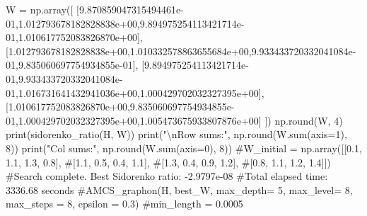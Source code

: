 \documentclass[
  letterpaper,
  DIV=11,
  numbers=noendperiod]{scrartcl}
\newenvironment{Shaded}{\begin{snugshade}}{\end{snugshade}}
\newcommand{\BuiltInTok}[1]{\textcolor[rgb]{0.00,0.23,0.31}{#1}}
\newcommand{\CharTok}[1]{\textcolor[rgb]{0.13,0.47,0.30}{#1}}
\newcommand{\CommentTok}[1]{\textcolor[rgb]{0.37,0.37,0.37}{#1}}
\newcommand{\DecValTok}[1]{\textcolor[rgb]{0.68,0.00,0.00}{#1}}
\newcommand{\FloatTok}[1]{\textcolor[rgb]{0.68,0.00,0.00}{#1}}
\newcommand{\NormalTok}[1]{\textcolor[rgb]{0.00,0.23,0.31}{#1}}
\newcommand{\OperatorTok}[1]{\textcolor[rgb]{0.37,0.37,0.37}{#1}}
\newcommand{\StringTok}[1]{\textcolor[rgb]{0.13,0.47,0.30}{#1}}
\begin{document}
\begin{Shaded}
\begin{Highlighting}[]
\NormalTok{W }\OperatorTok{=}\NormalTok{ np.array([}
\NormalTok{  [}\FloatTok{9.870859047315494461e{-}01}\NormalTok{,}\FloatTok{1.012793678182828838e+00}\NormalTok{,}\FloatTok{9.894975254113421714e{-}01}\NormalTok{,}\FloatTok{1.010617752083826870e+00}\NormalTok{],}
\NormalTok{[}\FloatTok{1.012793678182828838e+00}\NormalTok{,}\FloatTok{1.010332578863655684e+00}\NormalTok{,}\FloatTok{9.933433720332041084e{-}01}\NormalTok{,}\FloatTok{9.835060697754934855e{-}01}\NormalTok{],}
\NormalTok{[}\FloatTok{9.894975254113421714e{-}01}\NormalTok{,}\FloatTok{9.933433720332041084e{-}01}\NormalTok{,}\FloatTok{1.016731641432941036e+00}\NormalTok{,}\FloatTok{1.000429702032327395e+00}\NormalTok{],}
\NormalTok{[}\FloatTok{1.010617752083826870e+00}\NormalTok{,}\FloatTok{9.835060697754934855e{-}01}\NormalTok{,}\FloatTok{1.000429702032327395e+00}\NormalTok{,}\FloatTok{1.005473675933807876e+00}\NormalTok{]}
\NormalTok{])}
\NormalTok{np.}\BuiltInTok{round}\NormalTok{(W, }\DecValTok{4}\NormalTok{)}
\BuiltInTok{print}\NormalTok{(sidorenko\_ratio(H, W))}
\BuiltInTok{print}\NormalTok{(}\StringTok{"}\CharTok{\textbackslash{}n}\StringTok{Row sums:"}\NormalTok{, np.}\BuiltInTok{round}\NormalTok{(W.}\BuiltInTok{sum}\NormalTok{(axis}\OperatorTok{=}\DecValTok{1}\NormalTok{), }\DecValTok{8}\NormalTok{))}
\BuiltInTok{print}\NormalTok{(}\StringTok{"Col sums:"}\NormalTok{, np.}\BuiltInTok{round}\NormalTok{(W.}\BuiltInTok{sum}\NormalTok{(axis}\OperatorTok{=}\DecValTok{0}\NormalTok{), }\DecValTok{8}\NormalTok{))}
\CommentTok{\#W\_initial = np.array([[0.1, 1.1, 1.3, 0.8],}
\CommentTok{\#[1.1, 0.5, 0.4, 1.1],}
\CommentTok{\#[1.3, 0.4, 0.9, 1.2],}
\CommentTok{\#[0.8, 1.1, 1.2, 1.4]])}
\CommentTok{\#Search complete. Best Sidorenko ratio: {-}2.9797e{-}08}
\CommentTok{\#Total elapsed time: 3336.68 seconds}
\CommentTok{\#AMCS\_graphon(H, best\_W, max\_depth= 5, max\_level= 8, max\_steps = 8, epsilon = 0.3)}
\CommentTok{\#min\_length = 0.0005}


\end{Highlighting}
\end{Shaded}
\end{document}
